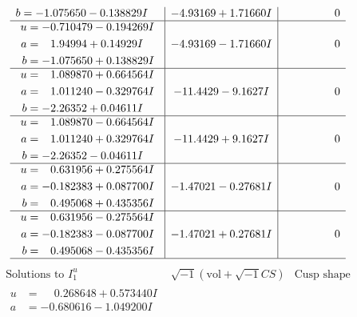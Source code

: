 \documentclass[1p]{elsarticle_modified}
\theoremstyle{definition}
\newcommand{\I}{\sqrt{-1}}
\begin{document}
$$\begin{array}{c|c|c}
\begin{aligned}
b &= -1.075650 - 0.138829 I\end{aligned}
 & -4.93169 + 1.71660 I & \phantom{-0.000000 } 0 \\ \hline\begin{aligned}
u &= -0.710479 - 0.194269 I \\
a &= \phantom{-}1.94994 + 0.14929 I \\
b &= -1.075650 + 0.138829 I\end{aligned}
 & -4.93169 - 1.71660 I & \phantom{-0.000000 } 0 \\ \hline\begin{aligned}
u &= \phantom{-}1.089870 + 0.664564 I \\
a &= \phantom{-}1.011240 - 0.329764 I \\
b &= -2.26352 + 0.04611 I\end{aligned}
 & -11.4429 - 9.1627 I & \phantom{-0.000000 } 0 \\ \hline\begin{aligned}
u &= \phantom{-}1.089870 - 0.664564 I \\
a &= \phantom{-}1.011240 + 0.329764 I \\
b &= -2.26352 - 0.04611 I\end{aligned}
 & -11.4429 + 9.1627 I & \phantom{-0.000000 } 0 \\ \hline\begin{aligned}
u &= \phantom{-}0.631956 + 0.275564 I \\
a &= -0.182383 + 0.087700 I \\
b &= \phantom{-}0.495068 + 0.435356 I\end{aligned}
 & -1.47021 - 0.27681 I & \phantom{-0.000000 } 0 \\ \hline\begin{aligned}
u &= \phantom{-}0.631956 - 0.275564 I \\
a &= -0.182383 - 0.087700 I \\
b &= \phantom{-}0.495068 - 0.435356 I\end{aligned}
 & -1.47021 + 0.27681 I & \phantom{-0.000000 } 0\\
 \hline 
 \end{array}$$\newpage$$\begin{array}{c|c|c}  
\text{Solutions to }I^u_{1}& \I (\text{vol} + \sqrt{-1}CS) & \text{Cusp shape}\\
 \hline 
\begin{aligned}
u &= \phantom{-}0.268648 + 0.573440 I \\
a &= -0.680616 - 1.049200 I \\

\end{aligned}
\end{array}$$
\end{document}
